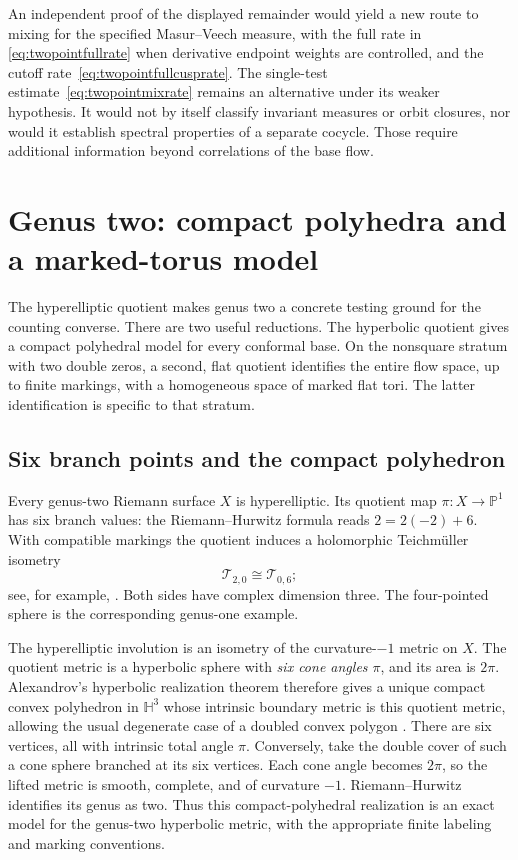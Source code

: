 \documentclass[11pt,a4paper]{article}
\numberwithin{equation}{section}
\theoremstyle{definition}
\theoremstyle{remark}
\newcommand{\T}{\mathcal T}
\newcommand{\HH}{\mathbb H}
\begin{document}
An independent proof of the displayed remainder would yield a new
route to mixing for the specified Masur--Veech measure, with the full rate
in \eqref{eq:twopointfullrate} when derivative endpoint weights are
controlled, and the cutoff rate~\eqref{eq:twopointfullcusprate}.
The single-test estimate~\eqref{eq:twopointmixrate} remains an
alternative under its weaker hypothesis.  It would not by itself classify invariant
measures or orbit closures, nor would it establish spectral properties
of a separate cocycle.  Those require additional information beyond
correlations of the base flow.


\section{Genus two: compact polyhedra and a marked-torus model}
\label{sec:genus2markedtorus}

The hyperelliptic quotient makes genus two a concrete testing ground
for the counting converse.  There are two useful reductions.  The
hyperbolic quotient gives a compact polyhedral model for every
conformal base.  On the nonsquare stratum with two double zeros,
a second, flat quotient identifies the entire flow space, up to
finite markings, with a homogeneous space of marked flat tori.
The latter identification is specific to that stratum.

\subsection{Six branch points and the compact polyhedron}
\label{subsec:genus2compact}

Every genus-two Riemann surface $X$ is hyperelliptic.  Its quotient
map $\pi:X\to\mathbb P^1$ has six branch values: the
Riemann--Hurwitz formula reads $2=2(-2)+6$.  With compatible
markings the quotient induces a holomorphic Teichm\"uller isometry
\[
 \T_{2,0}\cong\T_{0,6};
\]
see, for example, \cite[Corollary~1.2(3)]{BenirschkeServan}.
Both sides have complex dimension three.  The four-pointed sphere
is the corresponding genus-one example.

The hyperelliptic involution is an isometry of the curvature-$-1$
metric on $X$.  The quotient metric is a hyperbolic sphere with
\emph{six cone angles $\pi$}, and its area is $2\pi$.
Alexandrov's hyperbolic realization theorem therefore gives a
unique compact convex polyhedron in $\HH^3$ whose intrinsic
boundary metric is this quotient metric, allowing the usual
degenerate case of a doubled convex polygon
\cite[Theorem~1.1]{FillastreIzmestievCusps}.
There are six vertices, all with intrinsic total angle $\pi$.
Conversely, take the double cover of such a cone sphere branched at
its six vertices.  Each cone angle becomes $2\pi$, so the lifted
metric is smooth, complete, and of curvature $-1$.  Riemann--Hurwitz
identifies its genus as two.  Thus this compact-polyhedral
realization is an exact model for the genus-two hyperbolic metric,
with the appropriate finite labeling and marking conventions.
\end{document}
